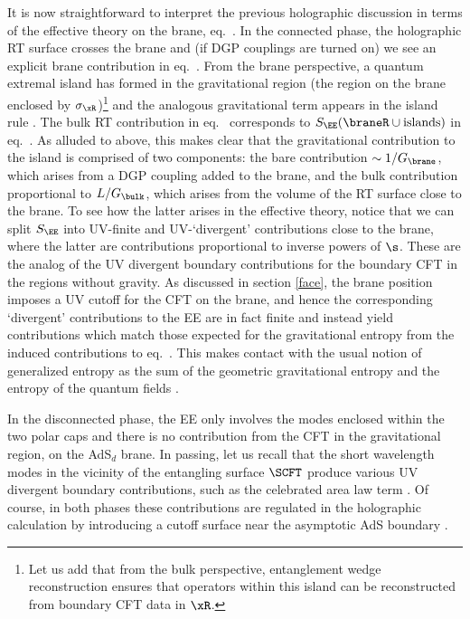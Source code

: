 It is now straightforward to interpret the previous holographic discussion in terms of the effective theory on the brane, eq.~. In the connected phase, the holographic RT surface crosses the brane and (if DGP couplings are turned on) we see an explicit brane contribution in eq.~. From the brane perspective, a quantum extremal island has formed in the gravitational region (\ie the region on the brane enclosed by $\sigma_\xR$)\footnote{Let us add that from the bulk perspective, entanglement wedge reconstruction \cite{EW1,EW2,EW3,Jafferis:2015del,Dong:2016eik,Faulkner:2017vdd,Cotler:2017erl} ensures that operators within this island can be reconstructed from boundary CFT data in $\xR$.} and the analogous gravitational term appears in the island rule . The bulk RT contribution in eq.~ corresponds to $S_\EE(\braneR \cup \text{islands})$ in eq.~. As alluded to above, this makes clear that the gravitational contribution to the island is comprised of two components: the bare contribution $\sim 1/G_\brane$, which arises from a DGP coupling added to the brane, and the bulk contribution proportional to $L/G_\bulk$, which arises from the volume of the RT surface close to the brane. 
To see how the latter arises in the effective theory, notice that we can split $S_\EE$ into UV-finite and UV-`divergent' contributions close to the brane, where the latter are contributions proportional to inverse powers of $\s$. These are the analog of the UV divergent boundary contributions for the boundary CFT in the regions without gravity. As discussed in section \ref{face}, the brane position imposes a UV cutoff for the CFT on the brane, and hence the corresponding `divergent' contributions to the EE are in fact finite and instead yield contributions which match those expected for the gravitational entropy from the induced contributions to eq.~. This makes contact with the usual notion of generalized entropy as the sum of the geometric gravitational entropy and the entropy of the quantum fields \cite{Faulkner:2013ana,Engelhardt:2014gca}.


In the disconnected phase, the EE only involves the modes enclosed within the two polar caps and there is no contribution from the CFT in the gravitational region, \ie on the AdS$_d$ brane. In passing, let us recall that the short wavelength modes in the vicinity of the entangling surface $\SCFT$ produce various UV divergent boundary contributions, such as the celebrated area law term \cite{Sorkin_1983,Bombelli:1986rw,Srednicki:1993im}. Of course, in both phases these contributions are regulated in the holographic calculation by introducing a cutoff surface near the asymptotic AdS boundary \cite{Rangamani:2016dms}.



